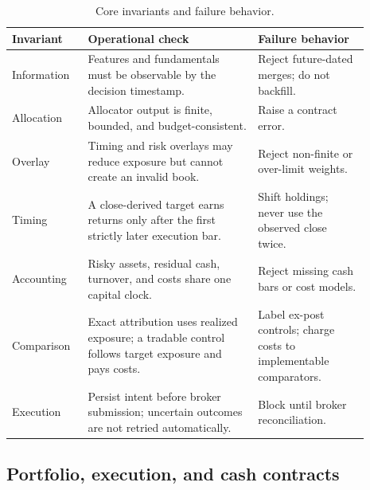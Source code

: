 \documentclass{article}
\begin{document}
\begin{table}[t]
  \caption{Core invariants and failure behavior.}
  \label{tab:invariants}
  \centering
  \small
  \begin{tabular}{>{\raggedright\arraybackslash}p{0.17\linewidth}
                  >{\raggedright\arraybackslash}p{0.43\linewidth}
                  >{\raggedright\arraybackslash}p{0.29\linewidth}}
    \toprule
    Invariant & Operational check & Failure behavior \\
    \midrule
    Information & Features and fundamentals must be observable by the decision timestamp. & Reject future-dated merges; do not backfill. \\
    Allocation & Allocator output is finite, bounded, and budget-consistent. & Raise a contract error. \\
    Overlay & Timing and risk overlays may reduce exposure but cannot create an invalid book. & Reject non-finite or over-limit weights. \\
    Timing & A close-derived target earns returns only after the first strictly later execution bar. & Shift holdings; never use the observed close twice. \\
    Accounting & Risky assets, residual cash, turnover, and costs share one capital clock. & Reject missing cash bars or cost models. \\
    Comparison & Exact attribution uses realized exposure; a tradable control follows target exposure and pays costs. & Label ex-post controls; charge costs to implementable comparators. \\
    Execution & Persist intent before broker submission; uncertain outcomes are not retried automatically. & Block until broker reconciliation. \\
    \bottomrule
  \end{tabular}
\end{table}

\subsection{Portfolio, execution, and cash contracts}
\end{document}
